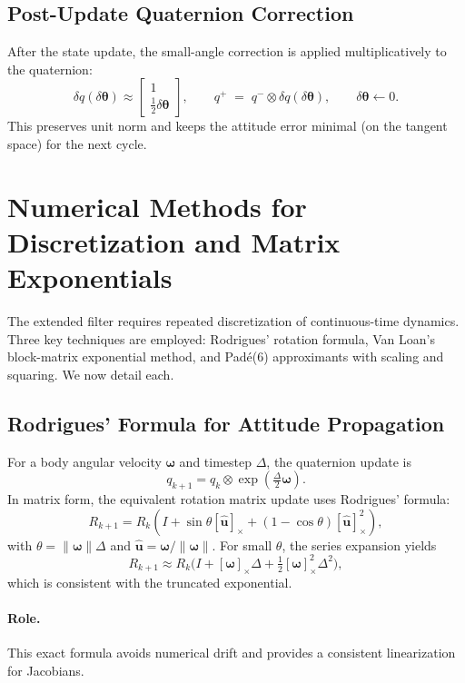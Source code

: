 \documentclass[10pt]{extarticle}
\begin{document}
\subsection{Post-Update Quaternion Correction}
After the state update, the small-angle correction is applied multiplicatively to the quaternion:
\begin{equation}
\delta q(\delta\bm\theta) \approx \begin{bmatrix}1\\ \tfrac{1}{2}\delta\bm\theta\end{bmatrix},
\qquad
q^+ \;=\; q^- \otimes \delta q(\delta\bm\theta),
\qquad
\delta\bm\theta \leftarrow 0.
\label{eq:quat-correct}
\end{equation}
This preserves unit norm and keeps the attitude error minimal (on the tangent space) for the next cycle.


\section{Numerical Methods for Discretization and Matrix Exponentials}
\label{sec:numerical-methods}

The extended filter requires repeated discretization of continuous-time dynamics.
Three key techniques are employed: Rodrigues’ rotation formula, Van Loan’s
block-matrix exponential method, and Pad\'e(6) approximants with scaling and
squaring. We now detail each.

\subsection{Rodrigues’ Formula for Attitude Propagation}
For a body angular velocity $\bm\omega$ and timestep $\Delta$, the quaternion update
is
\[
q_{k+1} = q_k \otimes \exp\!\left(\tfrac{\Delta}{2}\bm\omega\right).
\]
In matrix form, the equivalent rotation matrix update uses Rodrigues’ formula:
\begin{equation}
R_{k+1} = R_k\left(I + \sin\theta [\hat{\bm u}]_\times +
(1-\cos\theta)[\hat{\bm u}]_\times^2\right),
\label{eq:rodrigues-final}
\end{equation}
with $\theta = \|\bm\omega\|\Delta$ and $\hat{\bm u}=\bm\omega/\|\bm\omega\|$.
For small $\theta$, the series expansion yields
\[
R_{k+1} \approx R_k\Big(I + [\bm\omega]_\times \Delta + \tfrac{1}{2}[\bm\omega]_\times^2 \Delta^2\Big),
\]
which is consistent with the truncated exponential.

\paragraph{Role.}
This exact formula avoids numerical drift and provides a consistent
linearization for Jacobians.
\end{document}
